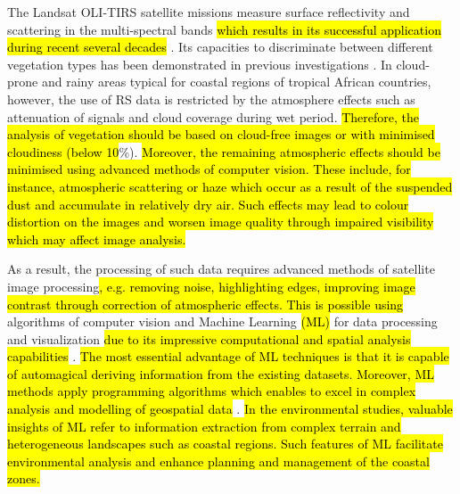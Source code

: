 \documentclass[coasts,article,submit,pdftex,moreauthors]{Definitions/mdpi}
\begin{document}
The Landsat OLI-TIRS satellite missions measure surface reflectivity and scattering in the multi-spectral bands \hl{which results in its successful application during recent several decades} \cite{WULDER2022113195}. Its capacities to discriminate between different vegetation types has been demonstrated in previous investigations \cite{Ferreira,Montfort,Fatoyinbo,Ribeiro}. In cloud-prone and rainy areas typical for coastal regions of tropical African countries, however, the use of RS data is restricted by the atmosphere effects such as attenuation of signals and cloud coverage during wet period. \hl{Therefore, the analysis of vegetation should be based on cloud-free images or with minimised cloudiness (below 10}\%). \hl{Moreover, the remaining atmospheric effects should be minimised using advanced methods of computer vision. These include, for instance, atmospheric scattering or haze which occur as a result of the suspended dust and accumulate in relatively dry air. Such effects may lead to colour distortion on the images and worsen image quality through impaired visibility which may affect image analysis. }

As a result, the processing of such data\hl{ }requires advanced methods of satellite image processing\hl{, e.g. removing noise, highlighting edges, improving image contrast through correction of atmospheric effects. This is possible using} algorithms of computer vision and Machine Learning \hl{(ML) }for data processing and visualization \hl{due to its impressive computational and spatial analysis capabilities }\cite{LI2023104653,PHAM2023104501,HAN202387}. \hl{The most essential advantage of ML techniques is that it is capable of automagical deriving information from the existing datasets. Moreover, ML methods apply programming algorithms which enables to excel in complex analysis and modelling of geospatial data} \cite{KHAN2022101678}. \hl{In the environmental studies, valuable insights of ML refer to information extraction from complex terrain and heterogeneous landscapes such as coastal regions. Such features of ML facilitate environmental analysis and enhance planning and management of the coastal zones.}
\end{document}
